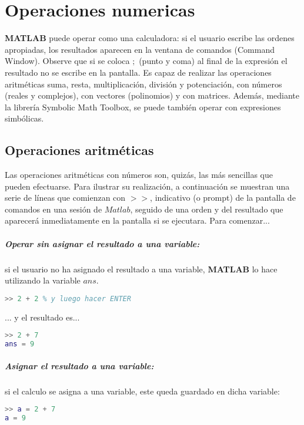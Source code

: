 \chapter{Operaciones numericas}

\textbf{MATLAB} puede operar como una calculadora: si el usuario escribe las ordenes apropiadas, los resultados aparecen en la ventana de comandos (Command Window). Observe que si se coloca $;$ (punto y coma) al final de la expresión el resultado no se escribe en la pantalla. Es capaz de realizar las operaciones aritméticas suma, resta, multiplicación, división y potenciación, con números (reales y complejos), con vectores (polinomios) y con matrices. Además, mediante la librería Symbolic Math Toolbox, se puede también operar con expresiones simbólicas.

\section{Operaciones aritméticas}

Las operaciones aritméticas con números son, quizás, las más sencillas que pueden efectuarse. Para ilustrar su realización, a continuación se muestran una serie de líneas que comienzan con $>>$, indicativo (o prompt) de la pantalla de comandos en una sesión de $Matlab$, seguido de una orden y del resultado que aparecerá inmediatamente en la pantalla si se ejecutara. Para comenzar...

\paragraph{Operar sin asignar el resultado a una variable:}si el usuario no ha asignado el resultado a una variable, \textbf{MATLAB} lo hace utilizando la
variable $ans$.
\begin{lstlisting}[language=Matlab]
>> 2 + 2 % y luego hacer ENTER
\end{lstlisting}

... y el resultado es...

\begin{lstlisting}[language=Matlab]
>> 2 + 7
ans = 9
\end{lstlisting}

\paragraph{Asignar el resultado a una variable:}si el calculo se asigna a una variable, este queda guardado en dicha variable:
\begin{lstlisting}[language=Matlab]
>> a = 2 + 7
a = 9
\end{lstlisting}

